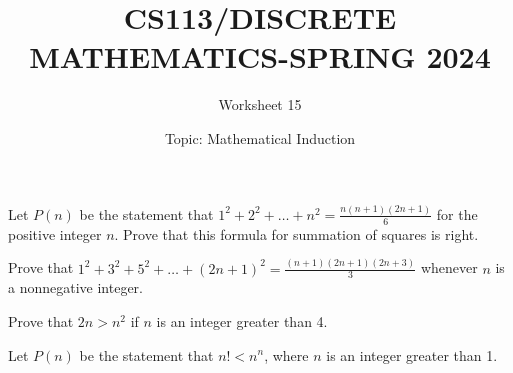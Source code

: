 \documentclass{exam}
\title{CS113/DISCRETE MATHEMATICS-SPRING 2024}
\author{Worksheet 15}
\date{Topic: Mathematical Induction}
\begin{document}
\maketitle

\begin{center}
\end{center}

\vspace{5mm}

\vspace{5mm}


\vspace{5mm}
\begin{questions}

\question
Let \(P(n)\) be the statement that \(1^2 + 2^2 + \ldots + n^2 = \frac{n(n + 1)(2n + 1)}{6}\) for the positive integer \(n\).
Prove that this formula for summation of squares is right.


\vspace{9in}



\question Prove that \(1^2 + 3^2 + 5^2 + \ldots + (2n + 1)^2 = \frac{(n + 1)(2n + 1)(2n + 3)}{3}\) whenever \(n\) is a nonnegative integer.

\vspace{9in}

\question Prove that $2n > n^2$ if $n$ is an integer greater than 4.
\vspace{9in}

\question Let \(P(n)\) be the statement that \(n! < n^n\), where \(n\) is an integer greater than 1.

\vspace{9in}



\end{questions}
\end{document}
